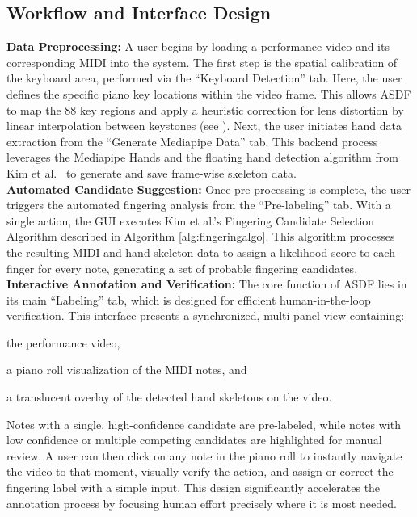 \documentclass{article}
\begin{document}
\subsection{Workflow and Interface Design}
\textbf{Data Preprocessing:} A user begins by loading a performance video and its corresponding MIDI into the system. The first step is the spatial calibration of the keyboard area, performed via the ``Keyboard Detection'' tab. Here, the user defines the specific piano key locations within the video frame. This allows ASDF to map the 88 key regions and apply a heuristic correction for lens distortion by linear interpolation between keystones (see ). Next, the user initiates hand data extraction from the ``Generate Mediapipe Data'' tab. This backend process leverages the Mediapipe Hands \cite{arXiv20Zhang} and the floating hand detection algorithm from Kim et al.~\cite{kim2025pianovam} to generate and save frame-wise skeleton data.\\
\textbf{Automated Candidate Suggestion:} Once pre-processing is complete, the user triggers the automated fingering analysis from the ``Pre-labeling'' tab. With a single action, the GUI executes Kim et al.'s Fingering Candidate Selection Algorithm \cite{kim2025pianovam} described in Algorithm \ref{alg:fingeringalgo}. This algorithm processes the resulting MIDI and hand skeleton data to assign a likelihood score to each finger for every note, generating a set of probable fingering candidates.\\
\textbf{Interactive Annotation and Verification:} The core function of ASDF lies in its main ``Labeling'' tab, which is designed for efficient human-in-the-loop verification. This interface presents a synchronized, multi-panel view containing: 
\begin{inparaenum}[(i)] 
\item the performance video, 
\item a piano roll visualization of the MIDI notes, and 
\item a translucent overlay of the detected hand skeletons on the video. 
\end{inparaenum}
 Notes with a single, high-confidence candidate are pre-labeled, while notes with low confidence or multiple competing candidates are highlighted for manual review. A user can then click on any note in the piano roll to instantly navigate the video to that moment, visually verify the action, and assign or correct the fingering label with a simple input. This design significantly accelerates the annotation process by focusing human effort precisely where it is most needed.
\end{document}
